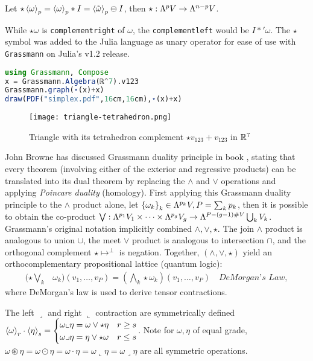 \documentclass{juliacon}
\begin{document}
\begin{definition}
	Let $\star\left\langle \omega \right\rangle_p = \left\langle \omega \right\rangle_p\ast I = \left\langle \tilde\omega \right\rangle_p\ominus I$, %
	 then $\star : \Lambda^pV\rightarrow\Lambda^{n-p}V$.
\end{definition}
\begin{remark}
	While $\star\omega$ is \verb`complementright` of $\omega$, the \verb`complementleft` would be $I\ast'\omega$. The $\star$ symbol was added to the Julia language as unary operator for ease of use with \verb`Grassmann` on Julia's v1.2 release.
\end{remark}
\begin{lstlisting}[language = Julia]
using Grassmann, Compose
x = Grassmann.Algebra(ℝ^7).v123
Grassmann.graph(⋆(x)+x)
draw(PDF("simplex.pdf",16cm,16cm),⋆(x)+x)
\end{lstlisting}
\begin{figure}[ht]
\centerline{\texttt{[image: triangle-tetrahedron.png]}}
\caption*{Triangle with its tetrahedron complement $\star v_{123} + v_{123}$ in $\mathbb{R}^7$}
\end{figure}
John Browne has discussed Grassmann duality principle in book \cite{browne}, stating that every theorem (involving either of the exterior and regressive products) can be translated into its dual theorem by replacing the $\wedge$ and $\vee$ operations and applying \textit{Poincare duality} (homology).
First applying this Grassmann duality principle to the $\wedge$ product alone, let $\left\{ \omega_k \right\}_k\in\Lambda^{p_k}V, P=\sum_kp_k$, then it is possible to obtain the co-product
$\bigvee :\Lambda^{p_1}V_1\times\dots\times\Lambda^{p_g}V_g \rightarrow \Lambda^{P-(g-1)\#V}\bigcup_k V_k$.
Grassmann's original notation implicitly combined $\wedge,\vee,\star$.
The join $\wedge$ product is analogous to union $\cup$, the meet $\vee$ product is analogous to intersection $\cap$, and the orthogonal complement $\star\mapsto^\perp$ is negation.
Together, $(\wedge,\vee,\star)$ yield an orthocomplementary propositional lattice (quantum logic):
\begin{align*}
	(\star\bigvee_k &\omega_k)(v_1,\dots,v_P) = (\bigwedge_k\star\omega_k)(v_1,\dots,v_P) \quad \textit{DeMorgan's Law},
\end{align*}
where DeMorgan's law is used to derive tensor contractions.
\begin{definition}
	The left $\lrcorner$ and right $\llcorner$ contraction are symmetrically defined
	$ \left\langle \omega \right\rangle_r\cdot\left\langle \eta \right\rangle_s = \begin{cases} \omega\llcorner\eta=\omega\vee\star\eta & r\geq s \\ \omega\lrcorner\eta=\eta\vee\star\omega & r\leq s \end{cases} $.
	Note for $\omega,\eta$ of equal grade, $\omega\circledast\eta = \omega\odot\eta = \omega\cdot\eta = \omega\llcorner\eta = \omega\lrcorner\eta$ are all symmetric operations.
\end{definition}
\end{document}
